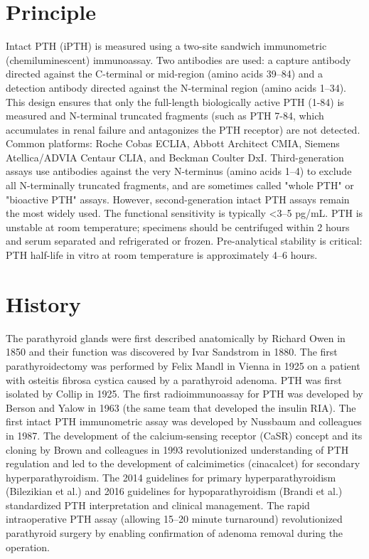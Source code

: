 \section*{Principle}
Intact PTH (iPTH) is measured using a two-site sandwich immunometric (chemiluminescent) immunoassay. Two antibodies are used: a capture antibody directed against the C-terminal or mid-region (amino acids 39--84) and a detection antibody directed against the N-terminal region (amino acids 1--34). This design ensures that only the full-length biologically active PTH (1-84) is measured and N-terminal truncated fragments (such as PTH 7-84, which accumulates in renal failure and antagonizes the PTH receptor) are not detected. Common platforms: Roche Cobas ECLIA, Abbott Architect CMIA, Siemens Atellica/ADVIA Centaur CLIA, and Beckman Coulter DxI. Third-generation assays use antibodies against the very N-terminus (amino acids 1--4) to exclude all N-terminally truncated fragments, and are sometimes called "whole PTH" or "bioactive PTH" assays. However, second-generation intact PTH assays remain the most widely used. The functional sensitivity is typically <3--5 pg/mL. PTH is unstable at room temperature; specimens should be centrifuged within 2 hours and serum separated and refrigerated or frozen. Pre-analytical stability is critical: PTH half-life in vitro at room temperature is approximately 4--6 hours.

\section*{History}
The parathyroid glands were first described anatomically by Richard Owen in 1850 and their function was discovered by Ivar Sandstrom in 1880. The first parathyroidectomy was performed by Felix Mandl in Vienna in 1925 on a patient with osteitis fibrosa cystica caused by a parathyroid adenoma. PTH was first isolated by Collip in 1925. The first radioimmunoassay for PTH was developed by Berson and Yalow in 1963 (the same team that developed the insulin RIA). The first intact PTH immunometric assay was developed by Nussbaum and colleagues in 1987. The development of the calcium-sensing receptor (CaSR) concept and its cloning by Brown and colleagues in 1993 revolutionized understanding of PTH regulation and led to the development of calcimimetics (cinacalcet) for secondary hyperparathyroidism. The 2014 guidelines for primary hyperparathyroidism (Bilezikian et al.) and 2016 guidelines for hypoparathyroidism (Brandi et al.) standardized PTH interpretation and clinical management. The rapid intraoperative PTH assay (allowing 15--20 minute turnaround) revolutionized parathyroid surgery by enabling confirmation of adenoma removal during the operation.


